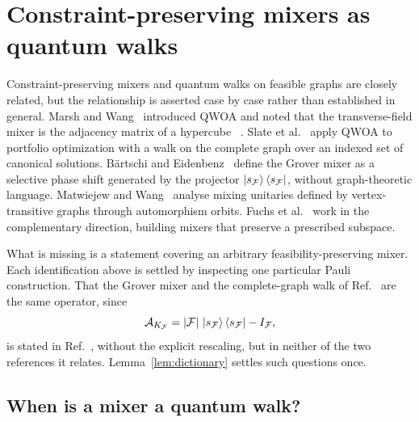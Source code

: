 \section{\label{sec:mixers-as-walks}Constraint-preserving mixers as
quantum walks}

Constraint-preserving mixers and quantum walks on feasible graphs are closely
related, but the relationship is asserted case by case rather than established
in general. Marsh and Wang~\cite{Marsh2020} introduced QWOA and
noted that the transverse-field mixer is the adjacency matrix of a hypercube ~\cite{Marsh2019}.
Slate et al.~\cite{Slate2021} apply QWOA to portfolio optimization with a walk
on the complete graph over an indexed set of canonical solutions. Bärtschi and
Eidenbenz~\cite{Bartschi2020} define the Grover mixer as a selective phase
shift generated by the projector $\ket{s_{\mathcal{F}}}\bra{s_{\mathcal{F}}}$, without
graph-theoretic language. Matwiejew and Wang~\cite{Matwiejew2024} analyse
mixing unitaries defined by vertex-transitive graphs through automorphism
orbits. Fuchs et al.~\cite{Fuchs2022,Fuchs2024} work in the complementary
direction, building mixers that preserve a prescribed subspace.

What is missing is a statement covering an arbitrary feasibility-preserving
mixer. Each identification above is settled by inspecting one particular Pauli
construction. That the
Grover mixer and the complete-graph walk of Ref.~\cite{Slate2021} are the same
operator, since
\begin{equation}
    \mathcal{A}_{K_{\mathcal{F}}} = |\mathcal{F}|\,\ket{s_{\mathcal{F}}}\bra{s_{\mathcal{F}}} - I_{\mathcal{F}} ,
    \label{eq:grover-complete}
\end{equation}
is stated in Ref.~\cite{Bridi2024}, without the explicit rescaling, but in
neither of the two references it relates.
Lemma~\ref{lem:dictionary} settles such
questions once. 

\subsection{\label{subsec:dictionary}When is a mixer a quantum walk?}

